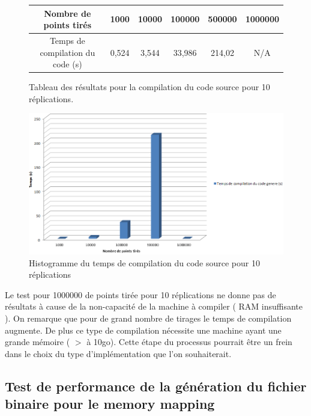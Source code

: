 \documentclass[a4paper,11pt]{report}
\begin{document}
\begin{figure}[h]
\begin{center}
\begin{tabular}{|c|c|c|c|c|c|}
\hline
Nombre de points tirés & 1000 & 10000 & 100000 & 500000 & 1000000 \\
\hline
Temps de compilation du code (s) & 0,524 & 3,544 & 33,986 & 214,02 & N/A
 \\
\hline
\end{tabular}
\end{center}
\caption{Tableau des résultats pour la compilation du code source pour 10 réplications.}
\end{figure}

 \clearpage
\begin{figure}[!h]
   \begin{center}
   \includegraphics[scale = 0.65]{grapheCompilationCode10.PNG}
   \end{center}
  \caption{Histogramme du temps de compilation du code source pour 10 réplications}
\end{figure}

\normalsize{
Le test pour 1000000 de points tirée pour 10 réplications ne donne pas de résultats à cause de la non-capacité de la machine à compiler ( RAM insuffisante ). On remarque que pour de grand nombre de tirages le temps de compilation augmente. De plus ce type de compilation nécessite une machine ayant une grande mémoire ( $>$ à 10go). Cette étape du processus pourrait être un frein dans le choix du type d'implémentation que l'on souhaiterait.
}

\subsection{Test de performance de la génération du fichier binaire pour le memory mapping}
\end{document}
